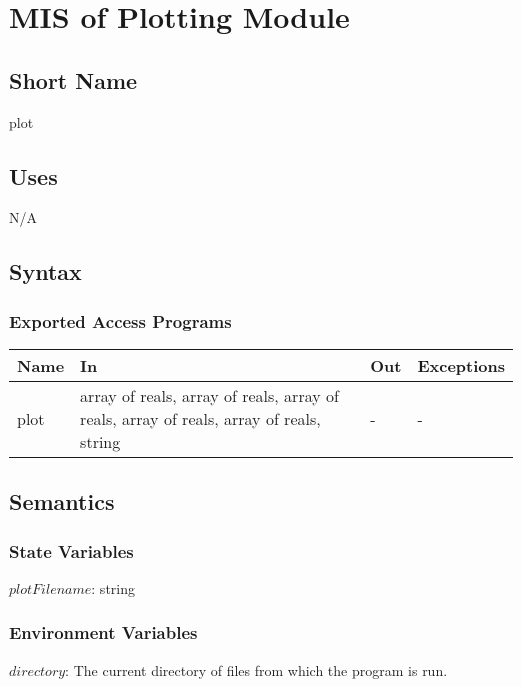 \documentclass[12pt]{article}
\begin{document}
\section{MIS of Plotting Module} \label{Plot}

\subsection{Short Name}

plot

\subsection{Uses}

N/A

\subsection{Syntax}

\subsubsection{Exported Access Programs}

\begin{center}
\begin{tabular}{p{2cm} p{8cm} p{2cm} p{2cm}}
\hline
\textbf{Name} & \textbf{In} & \textbf{Out} & \textbf{Exceptions} \\
\hline
plot & array of reals, array of reals, array of reals, array of reals, array of reals, string & - & - \\
\hline
\end{tabular}
\end{center}

\subsection{Semantics}

\subsubsection{State Variables}

$plotFilename$: string

\subsubsection{Environment Variables}

$directory$: The current directory of files from which the program is run.
\end{document}
